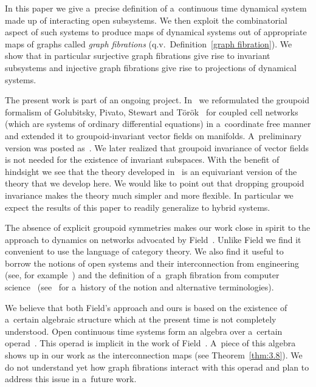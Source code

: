 \documentclass[pdftex]{sigma}
\numberwithin{equation}{section}
\begin{document}
In this paper we give a~precise def\/inition of a~continuous time dynamical system made up of interacting open subsystems.
We then exploit the combinatorial aspect of such systems to produce maps of dynamical systems out of appropriate maps of
graphs called {\it graph fibrations} (q.v.\ Def\/inition~\ref{graph fibration}).
We show that in particular surjective graph f\/ibrations give rise to invariant subsystems and injective graph f\/ibrations
give rise to projections of dynamical systems.

The present work is part of an ongoing project.
In~\cite{DL} we reformulated the groupoid formalism of Golubitsky, Pivato, Stewart and
T{\"o}r{\"o}k~\cite{Golubitsky.Stewart.Torok.05, Stewart.Golubitsky.Pivato.03} for coupled cell networks (which are
systems of ordinary dif\/ferential equations) in a~coordinate free manner and extended it to groupoid-invariant vector f\/ields on manifolds.
A~preliminary version was posted as~\cite{DLold}.
We later realized that groupoid invariance of vector f\/ields is not needed for the existence of invariant subspaces.
With the benef\/it of hindsight we see that the theory developed in~\cite{DL} is an equivariant version of the theory that
we develop here.
We would like to point out that dropping groupoid invariance makes the theory much simpler and more f\/lexible.
In particular we expect the results of this paper to readily generalize to hybrid systems.

The absence of explicit groupoid symmetries makes our work close in spirit to the approach to dynamics on networks
advocated by Field~\cite{FieldCD}.
Unlike Field we f\/ind it convenient to use the language of category theory.
We also f\/ind it useful to borrow the notions of open systems and their interconnection from engineering (see, for
example~\cite{Brockett, Pappas, willems}) and the def\/inition of a~graph f\/ibration from computer science~\cite{Vigna1}
(see~\cite{VignaFibPage} for a~history of the notion and alternative terminologies).

We believe that both Field's approach and ours is based on the existence of a~certain algebraic structure which at the
present time is not completely understood.
Open continuous time systems form an algebra over a~certain operad~\cite{VSL}.
This operad is implicit in the work of Field~\cite{FieldCD}.
A~piece of this algebra shows up in our work as the interconnection maps (see Theorem~\ref{thm:3.8}).
We do not understand yet how graph f\/ibrations interact with this operad and plan to address this issue in a~future work.
\end{document}
